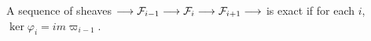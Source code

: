 \begin{definition}
  A sequence of sheaves $\longrightarrow \mathcal{F}_{i-1} \longrightarrow \mathcal{F}_{i} \longrightarrow \mathcal{F}_{i+1} \longrightarrow$
	is exact if for each $i$, $\ker \varphi_i = im \varpi_{i-1}$.
\end{definition}

